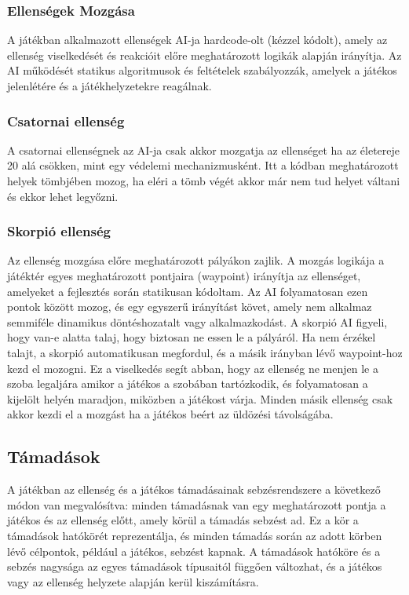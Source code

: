 \documentclass[
]{thesis-ekf}
\theoremstyle{definition}
\theoremstyle{remark}
\begin{document}
\subsubsection{Ellenségek Mozgása}
A játékban alkalmazott ellenségek AI-ja hardcode-olt (kézzel kódolt), amely az ellenség viselkedését és reakcióit előre meghatározott logikák alapján irányítja. Az AI működését statikus algoritmusok és feltételek szabályozzák, amelyek a játékos jelenlétére és a játékhelyzetekre reagálnak.
\subsubsection{Csatornai ellenség}
A csatornai ellenségnek az AI-ja csak akkor mozgatja az ellenséget ha az életereje 20 alá csökken, mint egy védelemi mechanizmusként. Itt a kódban meghatározott helyek tömbjében mozog, ha eléri a tömb végét akkor már nem tud helyet váltani és ekkor lehet legyőzni.
\subsubsection{Skorpió ellenség}
Az ellenség mozgása előre meghatározott pályákon zajlik. A mozgás logikája a játéktér egyes meghatározott pontjaira (waypoint) irányítja az ellenséget, amelyeket a fejlesztés során statikusan kódoltam. Az AI folyamatosan ezen pontok között mozog, és egy egyszerű irányítást követ, amely nem alkalmaz semmiféle dinamikus döntéshozatalt vagy alkalmazkodást.
A skorpió AI figyeli, hogy van-e alatta talaj, hogy biztosan ne essen le a pályáról. Ha nem érzékel talajt, a skorpió automatikusan megfordul, és a másik irányban lévő waypoint-hoz kezd el mozogni. Ez a viselkedés segít abban, hogy az ellenség ne menjen le a szoba legaljára amikor a játékos a szobában tartózkodik, és folyamatosan a kijelölt helyén maradjon, miközben a játékost várja.
Minden másik ellenség csak akkor kezdi el a mozgást ha a játékos beért az üldözési távolságába.
\subsection{Támadások}
A játékban az ellenség és a játékos támadásainak sebzésrendszere a következő módon van megvalósítva: minden támadásnak van egy meghatározott pontja a játékos és az ellenség előtt, amely körül a támadás sebzést ad. Ez a kör a támadások hatókörét reprezentálja, és minden támadás során az adott körben lévő célpontok, például a játékos, sebzést kapnak. A támadások hatóköre és a sebzés nagysága az egyes támadások típusaitól függően változhat, és a játékos vagy az ellenség helyzete alapján kerül kiszámításra.
\end{document}
